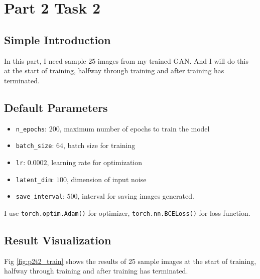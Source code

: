 \documentclass{article}
\begin{document}
\section{Part 2 Task 2}

\subsection{Simple Introduction}

In this part, I need sample 25 images from my trained GAN. And I will do this at the start of training, halfway through training and after training has terminated.

\subsection{Default Parameters}

\begin{itemize}
    \item \texttt{n\_epochs}: $200$, maximum number of epochs to train the model
    \item \texttt{batch\_size}: $64$, batch size for training
    \item \texttt{lr}: $0.0002$, learning rate for optimization
    \item \texttt{latent\_dim}: $100$, dimension of input noise
    \item \texttt{save\_interval}: $500$, interval for saving images generated.
\end{itemize}

I use \texttt{torch.optim.Adam()} for optimizer, \texttt{torch.nn.BCELoss()} for loss function.

\subsection{Result Visualization}

Fig \ref{fig:p2t2_train} shows the results of 25 sample images at the start of training, halfway through training and after training has terminated.
\end{document}

